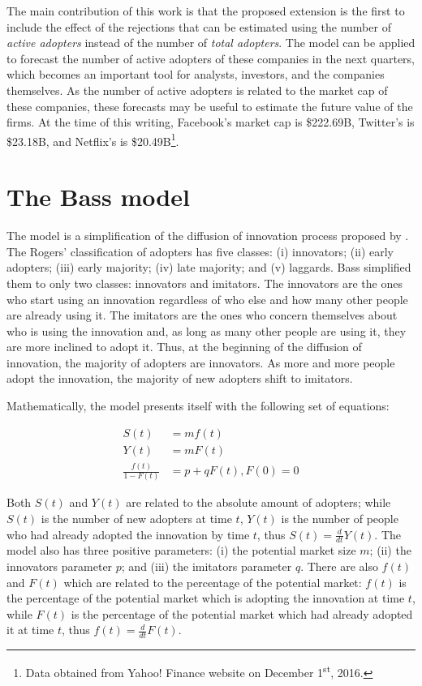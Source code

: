 The main contribution of this work is that the proposed extension is the first to include the effect of the rejections that can be estimated using the number of \textit{active adopters} instead of the number of \textit{total adopters}. The model can be applied to forecast the number of active adopters of these companies in the next quarters, which becomes an important tool for analysts, investors, and the companies themselves. As the number of active adopters is related to the market cap of these companies, these forecasts may be useful to estimate the future value of the firms. At the time of this writing, Facebook's market cap is \$222.69B, Twitter's is \$23.18B, and Netflix's is \$20.49B\footnote{Data obtained from Yahoo! Finance website on December 1\textsuperscript{st}, 2016.}.


\chapter{The Bass model}

The \citet{bass1969} model is a simplification of the diffusion of innovation process proposed by \citet{rogers1962diffusion}. The Rogers' classification of adopters has five classes: (i) innovators; (ii) early adopters; (iii) early majority; (iv) late majority; and (v) laggards. Bass simplified them to only two classes: innovators and imitators. The innovators are the ones who start using an innovation regardless of who else and how many other people are already using it. The imitators are the ones who concern themselves about who is using the innovation and, as long as many other people are using it, they are more inclined to adopt it. Thus, at the beginning of the diffusion of innovation, the majority of adopters are innovators. As more and more people adopt the innovation, the majority of new adopters shift to imitators.

Mathematically, the model presents itself with the following set of equations:

\begin{align}
S(t) &= mf(t) \\
Y(t) &= mF(t) \\
\frac{f(t)}{1-F(t)} &= p + qF(t), F(0)=0 \label{eq:bass:ode}
\end{align}

Both $S(t)$ and $Y(t)$ are related to the absolute amount of adopters; while $S(t)$ is the number of new adopters at time $t$, $Y(t)$ is the number of people who had already adopted the innovation by time $t$, thus $S(t) = \frac{d}{dt} Y(t)$. The model also has three positive parameters: (i) the potential market size $m$; (ii) the innovators parameter $p$; and (iii) the imitators parameter $q$. There are also $f(t)$ and $F(t)$ which are related to the percentage of the potential market: $f(t)$ is the percentage of the potential market which is adopting the innovation at time $t$, while $F(t)$ is the percentage of the potential market which had already adopted it at time $t$, thus $f(t) = \frac{d}{dt} F(t)$.

